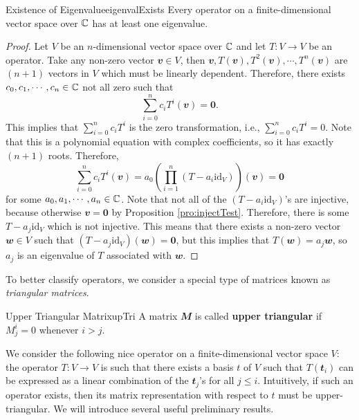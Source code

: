 \documentclass[math, code]{amznotes}
\theoremstyle{remark}
\newcommand{\zero}{\mathbf{0}}
\begin{document}
\begin{probox}{Existence of Eigenvalue}{eigenvalExists}
    Every operator on a finite-dimensional vector space over $\mathbb{C}$ has at least one eigenvalue.
    \tcblower
    \begin{proof}
        Let $V$ be an $n$-dimensional vector space over $\mathbb{C}$ and let $T \colon V \to V$ be an operator. Take any non-zero vector $\mathbfit{v} \in V$, then $\mathbfit{v}, T(\mathbfit{v}), T^2(\mathbfit{v}), \cdots, T^n(\mathbfit{v})$ are $(n + 1)$ vectors in $V$ which must be linearly dependent. Therefore, there exists $c_0, c_1, \cdots, c_n \in \mathbb{C}$ not all zero such that 
        \begin{equation*}
            \sum_{i = 0}^{n}c_iT^i(\mathbfit{v}) = \zero.
        \end{equation*}
        This implies that $\sum_{i = 0}^{n}c_iT^i$ is the zero transformation, i.e., $\sum_{i = 0}^{n}c_iT^i = 0$. Note that this is a polynomial equation with complex coefficients, so it has exactly $(n + 1)$ roots. Therefore, 
        \begin{equation*}
            \sum_{i = 0}^{n}c_iT^i(\mathbfit{v}) = a_0\left(\prod_{i = 1}^{n}(T - a_i\mathrm{id}_V)\right)(\mathbfit{v}) = \zero
        \end{equation*}
        for some $a_0, a_1, \cdots, a_n \in \mathbb{C}$. Note that not all of the $(T - a_i\mathrm{id}_V)$'s are injective, because otherwise $\mathbfit{v} = \zero$ by Proposition \ref{pro:injectTest}. Therefore, there is some $T - a_j\mathrm{id}_V$ which is not injective. This means that there exists a non-zero vector $\mathbfit{w} \in V$ such that $(T - a_j\mathrm{id}_V)(\mathbfit{w}) = \zero$, but this implies that $T(\mathbfit{w}) = a_j\mathbfit{w}$, so $a_j$ is an eigenvalue of $T$ associated with $\mathbfit{w}$.
    \end{proof}
\end{probox}
To better classify operators, we consider a special type of matrices known as \textit{triangular matrices}.
\begin{dfnbox}{Upper Triangular Matrix}{upTri}
    A matrix $\mathbfit{M}$ is called {\color{red} \textbf{upper triangular}} if $M^i_j = 0$ whenever $i > j$.
\end{dfnbox}
We consider the following nice operator on a finite-dimensional vector space $V$: the operator $T \colon V \to V$ is such that there exists a basis $t$ of $V$ such that $T(\mathbfit{t}_i)$ can be expressed as a linear combination of the $\mathbfit{t}_j$'s for all $j \leq i$. Intuitively, if such an operator exists, then its matrix representation with respect to $t$ must be upper-triangular. We will introduce several useful preliminary results.
\end{document}
